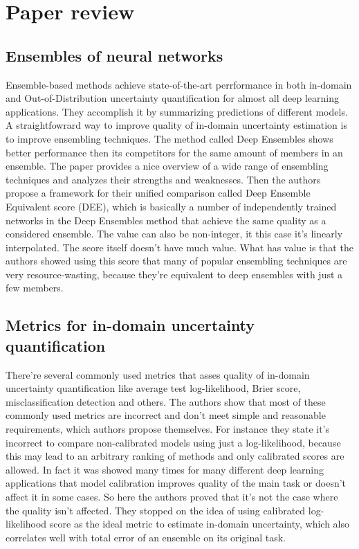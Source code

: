 \documentclass{article}
\begin{document}
\section{Paper review}
\subsection{Ensembles of neural networks}
    Ensemble-based methods achieve state-of-the-art perrformance in both in-domain and Out-of-Distribution uncertainty quantification for almost all deep learning applications. They accomplish it by summarizing predictions of different models. A straightfowrard way to improve quality of in-domain uncertainty estimation is to improve ensembling techniques. The method called Deep Ensembles \cite{ensembles} shows better performance then its competitors for the same amount of members in an ensemble. The paper \cite{pitfalls} provides a nice overview of a wide range of ensembling techniques and analyzes their strengths and weaknesses. Then the authors propose a framework for their unified comparison called Deep Ensemble Equivalent score (DEE), which is basically a number of independently trained networks in the Deep Ensembles method that achieve the same quality as a considered ensemble. The value can also be non-integer, it this case it's linearly interpolated. The score itself doesn't have much value. What has value is that the authors showed using this score that many of popular ensembling techniques are very resource-wasting, because they're equivalent to deep ensembles with just a few members.

\subsection{Metrics for in-domain uncertainty quantification}
    There're several commonly used metrics that asses quality of in-domain uncertainty quantification like average test log-likelihood, Brier score, misclassification detection and others. The authors show that most of these commonly used metrics are incorrect and don't meet simple and reasonable requirements, which authors propose themselves. For instance they state it's incorrect to compare non-calibrated models using just a log-likelihood, because this may lead to an arbitrary ranking of methods and only calibrated scores are allowed. In fact it was showed many times for many different deep learning applications that model calibration improves quality of the main task or doesn't affect it in some cases. So here the authors proved that it's not the case where the quality isn't affected. They stopped on the idea of using calibrated log-likelihood score as the ideal metric to estimate in-domain uncertainty, which also correlates well with total error of an ensemble on its original task.
\end{document}
